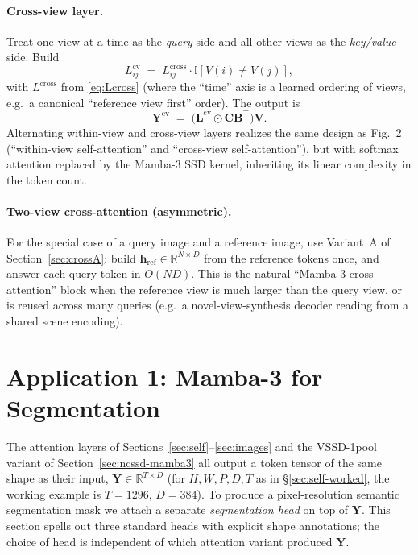 \documentclass[11pt,a4paper]{article}
\begin{document}
\paragraph{Cross-view layer.} Treat one view at a time as the
\emph{query} side and all other views as the \emph{key/value} side.
Build
\begin{equation}\label{eq:Lxview}
  L_{ij}^{\text{cv}}
    \;=\; L^{\text{cross}}_{ij}\cdot \mathbb{I}[V(i)\neq V(j)],
\end{equation}
with $L^{\text{cross}}$ from \eqref{eq:Lcross} (where the ``time'' axis
is a learned ordering of views, e.g.\ a canonical ``reference view
first'' order). The output is
\begin{equation}\label{eq:cvout}
  \bm{Y}^{\text{cv}} \;=\; \bigl(\bm{L}^{\text{cv}}\odot\bm{C}\bm{B}^\top\bigr)\bm{V}.
\end{equation}
Alternating within-view and cross-view layers realizes the same
design as \cite{depthanything3} Fig.~2 (``within-view
self-attention'' and ``cross-view self-attention''), but with softmax
attention replaced by the Mamba-3 SSD kernel, inheriting its linear
complexity in the token count.

\paragraph{Two-view cross-attention (asymmetric).} For the special
case of a query image and a reference image, use Variant~A of
Section~\ref{sec:crossA}: build
$\bm{h}_{\text{ref}}\in\mathbb{R}^{N\times D}$ from the reference
tokens once, and answer each query token in $O(ND)$. This is the
natural ``Mamba-3 cross-attention'' block when the reference view is
much larger than the query view, or is reused across many queries
(e.g.\ a novel-view-synthesis decoder reading from a shared scene
encoding).

\section{Application 1: Mamba-3 for Segmentation}
\label{sec:app-seg}
\label{sec:seg}

The attention layers of Sections~\ref{sec:self}--\ref{sec:images} and
the VSSD-1pool variant of Section~\ref{sec:ncssd-mamba3} all output a
token tensor of the same shape as their input, $\bm{Y}\in
\mathbb{R}^{T\times D}$ (for $H,W,P,D,T$ as in
\S\ref{sec:self-worked}, the working example is
$T\!=\!1296,\,D\!=\!384$). To produce a pixel-resolution semantic
segmentation mask we attach a separate \emph{segmentation head} on top
of $\bm{Y}$. This section spells out three standard heads with
explicit shape annotations; the choice of head is independent of
which attention variant produced $\bm{Y}$.
\end{document}
